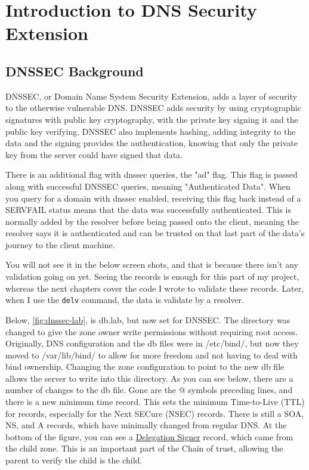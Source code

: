 \chapter{Introduction to DNS Security Extension}

\section{DNSSEC Background}
    DNSSEC, or Domain Name System Security Extension, adds a layer of security to the otherwise vulnerable DNS. DNSSEC adds security by using cryptographic signatures
with public key cryptography, with the private key signing it and the public key verifying. DNSSEC also implements hashing, adding integrity to the data and the signing 
provides the authentication, knowing that only the private key from the server could have signed that data.

There is an additional flag with dnssec queries, the "ad" flag. This flag is passed along with successful DNSSEC queries, meaning "Authenticated Data". When you query 
for a domain with dnssec enabled, receiving this flag back instead of a SERVFAIL status means that the data was successfully authenticated. This is normally added by the 
resolver before being passed onto the client, meaning the resolver says it is authenticated and can be trusted on that last part of the data's journey to the client machine.

You will not see it in the below screen shots, and that is because there isn't any validation going on yet. Seeing the records is enough for this part 
of my project, whereas the next chapters cover the code I wrote to validate these records. Later, when I use the \texttt{delv} command, the data is validate by a resolver.

Below, \cref{fig:dnssec-lab}, is db.lab, but now set for DNSSEC. The directory was changed to give the zone owner write permissions without requiring root access. Originally, 
DNS configuration and the db files were in /etc/bind/, but now they moved to /var/lib/bind/ to allow for more freedom and not having to deal with bind ownership. Changing 
the zone configuration to point to the new db file allows the server to write into this directory. As you can see below, there are a number of changes to the db file.
Gone are the @ symbols preceding lines, and there is a new minimum time record. This sets the minimum Time-to-Live (TTL) for records, especially for the Next SECure (NSEC) records. There 
is still a SOA, NS, and A records, which have minimally changed from regular DNS. 
At the bottom of the figure, you can see a \hyperref[subsec:ds]{Delegation Signer} record,
which came from the child zone. This is an important part of the Chain of trust, allowing the parent to verify the child is the child.\cite{dnssec-ubuntu}

